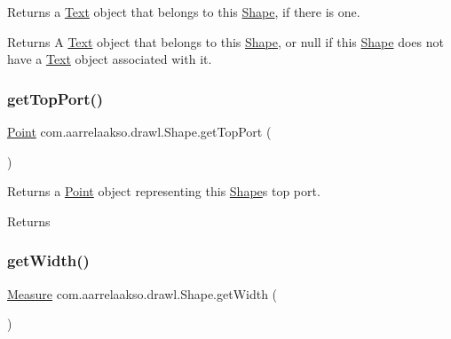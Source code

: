 Returns a \hyperlink{classcom_1_1aarrelaakso_1_1drawl_1_1_text}{Text} object that belongs to this \hyperlink{classcom_1_1aarrelaakso_1_1drawl_1_1_shape}{Shape}, if there is one. 

\begin{DoxyReturn}{Returns}
A \hyperlink{classcom_1_1aarrelaakso_1_1drawl_1_1_text}{Text} object that belongs to this \hyperlink{classcom_1_1aarrelaakso_1_1drawl_1_1_shape}{Shape}, or {\ttfamily null} if this \hyperlink{classcom_1_1aarrelaakso_1_1drawl_1_1_shape}{Shape} does not have a \hyperlink{classcom_1_1aarrelaakso_1_1drawl_1_1_text}{Text} object associated with it. 
\end{DoxyReturn}
\mbox{\label{classcom_1_1aarrelaakso_1_1drawl_1_1_shape_aed4e9caa294aacc973b7a531a960e9e5}} 
\subsubsection{\texorpdfstring{get\+Top\+Port()}{getTopPort()}}
{\footnotesize\ttfamily \hyperlink{classcom_1_1aarrelaakso_1_1drawl_1_1_point}{Point} com.\+aarrelaakso.\+drawl.\+Shape.\+get\+Top\+Port (\begin{DoxyParamCaption}{ }\end{DoxyParamCaption})\hspace{0.3cm}{\ttfamily [inherited]}}



Returns a \hyperlink{classcom_1_1aarrelaakso_1_1drawl_1_1_point}{Point} object representing this \hyperlink{classcom_1_1aarrelaakso_1_1drawl_1_1_shape}{Shape}\textquotesingle{}s top port. 

\begin{DoxyReturn}{Returns}

\end{DoxyReturn}
\mbox{\label{classcom_1_1aarrelaakso_1_1drawl_1_1_shape_a3e2c58984f1bcbc2e9e86cf30868561e}} 
\subsubsection{\texorpdfstring{get\+Width()}{getWidth()}}
{\footnotesize\ttfamily \hyperlink{classcom_1_1aarrelaakso_1_1drawl_1_1_measure}{Measure} com.\+aarrelaakso.\+drawl.\+Shape.\+get\+Width (\begin{DoxyParamCaption}{ }\end{DoxyParamCaption})\hspace{0.3cm}{\ttfamily [inherited]}}



